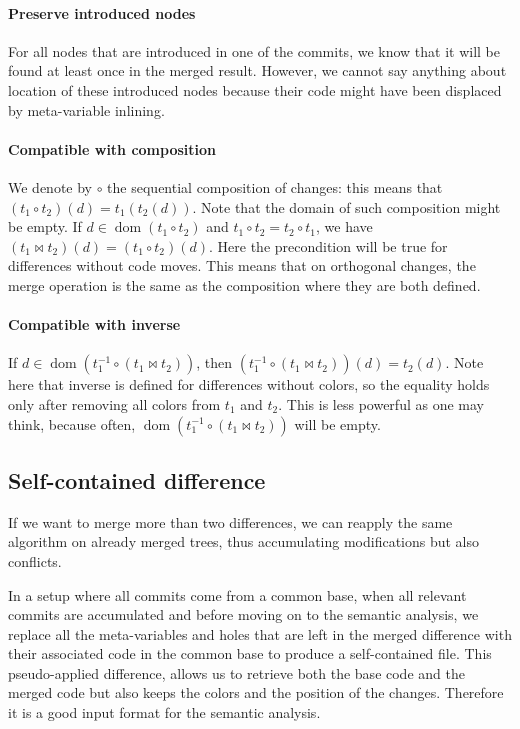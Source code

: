 \documentclass[a4paper,11pt]{article}
\newcommand\merge{\mathbin{\Join}}
\DeclareMathOperator\dom{dom}
\newcommand\gb[1]{}%
\newcommand\todo[1]{}%
\begin{document}
\paragraph{Preserve introduced nodes}
For all nodes that are introduced in one of the commits, we know that it will be found at least once in the merged result. However, we cannot say anything about location of these introduced nodes because their code might have been displaced by meta-variable inlining.

\paragraph{Compatible with composition}
We denote by $\circ$ the sequential composition of changes: this means that $(t_1 \circ t_2)(d) = t_1(t_2(d))$. Note that the domain of such composition might be empty.
If $d \in \dom(t_1 \circ t_2)$ and $t_1 \circ t_2 = t_2 \circ
t_1$, we have $(t_1 \merge t_2)(d) = (t_1 \circ t_2)(d)$. Here the
precondition will be true for differences without code moves. This
means that on orthogonal changes, the merge operation is the same as
the composition where they are both defined. \todo{Check that we
  cannot remove the domain assumption}\gb{This check is out of scope with the time I have left...}

\paragraph{Compatible with inverse}
If $d \in \dom(t_1^{-1} \circ (t_1 \merge t_2))$, then $(t_1^{-1}
\circ (t_1 \merge t_2))(d) = t_2(d)$. Note here that inverse is
defined for differences without colors, so the equality holds only
after removing all colors from $t_1$ and $t_2$. This is less powerful as one may think, because often, $\dom(t_1^{-1} \circ (t_1 \merge t_2))$ will be empty.

\subsection{Self-contained difference}

If we want to merge more than two differences, we can reapply the same
algorithm on already merged trees, thus accumulating modifications but
also conflicts.

In a setup where all commits come from a common base, when all relevant commits are accumulated and before moving on to the semantic analysis, we replace all the meta-variables and holes that are left in the merged difference with their associated code in the common base to produce a self-contained file. This pseudo-applied difference, allows us to retrieve both the base code and the merged code but also keeps the colors and the position of the changes. Therefore it is a good input format for the semantic analysis.
\end{document}
